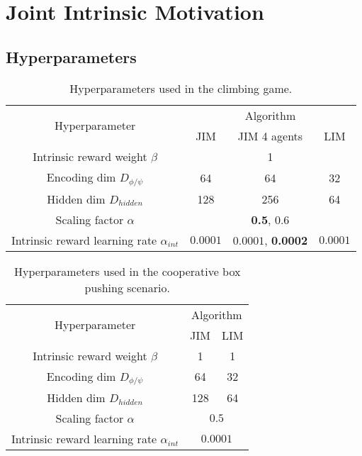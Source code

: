 \chapter{Joint Intrinsic Motivation} 

\section{Hyperparameters}\label{app:JIM:hpp}

\begin{table}[h]
    \centering
    \caption{Hyperparameters used in the climbing game.}
    \begin{tabular}{cccc}
        \hline
        \multirow{2}{*}{Hyperparameter}               & \multicolumn{3}{c}{Algorithm} \\ \cline{2-4} 
                                                      & JIM & JIM 4 agents & LIM \\ \hline
        Intrinsic reward weight $\beta$               & \multicolumn{3}{c}{1}   \\ 
        Encoding dim $D_{\phi/\psi}$                  & 64 & 64 & 32  \\ 
        Hidden dim $D_{hidden}$                       & 128 & 256 & 64  \\ 
        Scaling factor $\alpha$                       & \multicolumn{3}{c}{\textbf{0.5}, $0.6$}     \\ 
        Intrinsic reward learning rate $\alpha_{int}$ & $0.0001$ & $0.0001$, \textbf{0.0002} & $0.0001$  \\ \hline
    \end{tabular}      
\end{table}

\begin{table}[h]
    \centering
    \caption{Hyperparameters used in the cooperative box pushing scenario.}
    \begin{tabular}{ccc}
        \hline
        \multirow{2}{*}{Hyperparameter}               & \multicolumn{2}{c}{Algorithm} \\ \cline{2-3} 
                                                      & \multicolumn{1}{c}{JIM} & LIM \\ \hline
        Intrinsic reward weight $\beta$               & \multicolumn{1}{c}{1}   & 1   \\ 
        Encoding dim $D_{\phi/\psi}$                  & \multicolumn{1}{c}{64}  & 32  \\ 
        Hidden dim $D_{hidden}$                       & \multicolumn{1}{c}{128} & 64  \\ 
        Scaling factor $\alpha$                       & \multicolumn{2}{c}{$0.5$}     \\ 
        Intrinsic reward learning rate $\alpha_{int}$ & \multicolumn{2}{c}{$0.0001$}  \\ \hline
    \end{tabular} 
\end{table}

